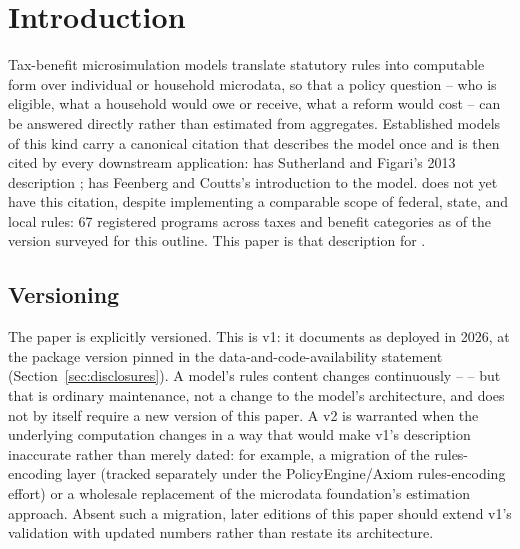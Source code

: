 \section{Introduction}
\label{sec:introduction}

Tax-benefit microsimulation models translate statutory rules into
computable form over individual or household microdata, so that a policy
question -- who is eligible, what a household would owe or receive, what a
reform would cost -- can be answered directly rather than estimated from
aggregates. Established models of this kind carry a canonical citation that
describes the model once and is then cited by every downstream application:
\euromod{} has Sutherland and Figari's 2013 description
\citep{sutherland2013euromod}; \taxsim{} has Feenberg and Coutts's
introduction to the model.
 \policyengineus{} does not yet
have this citation, despite implementing a comparable scope of federal,
state, and local rules: 67 registered programs across taxes and benefit
categories as of the version surveyed for this outline.
This paper is that description for \policyengineus{}.

\subsection{Versioning}
\label{sec:versioning}

The paper is explicitly versioned. This is v1: it documents
\policyengineus{} as deployed in 2026, at the package version pinned in the
data-and-code-availability statement (Section~\ref{sec:disclosures}). A
model's rules content changes continuously --  -- but that is ordinary maintenance,
not a change to the model's architecture, and does not by itself require a
new version of this paper. A v2 is warranted when the underlying computation
changes in a way that would make v1's description inaccurate rather than
merely dated: for example, a migration of the rules-encoding layer (tracked
separately under the PolicyEngine/Axiom rules-encoding effort) or a
wholesale replacement of the microdata foundation's estimation approach.
Absent such a migration, later editions of this paper should extend v1's
validation with updated numbers rather than restate its architecture.

